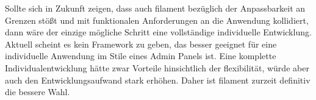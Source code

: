 Sollte sich in Zukunft zeigen, dass auch filament bezüglich der Anpassbarkeit an Grenzen stößt und mit funktionalen Anforderungen an die Anwendung kollidiert, dann wäre der einzige mögliche Schritt eine vollständige individuelle Entwicklung.
Aktuell scheint es kein Framework zu geben, das besser geeignet für eine individuelle Anwendung im Stile eines Admin Panels ist.
Eine komplette Individualentwicklung hätte zwar Vorteile hinsichtlich der flexibilität, würde aber auch den Entwicklungsaufwand stark erhöhen.
Daher ist filament zurzeit definitiv die bessere Wahl.

